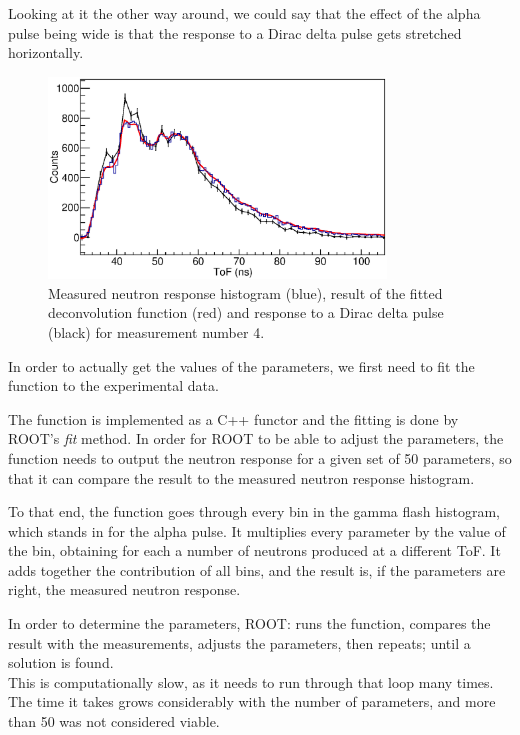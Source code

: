 \documentclass[a4paper,12pt]{report}
\begin{document}
Looking at it the other way around, we could say that the effect of the alpha pulse being wide is that the response to a Dirac delta pulse gets stretched horizontally.
\\

\begin{figure}[H]
	\centering
	\includegraphics[width=0.80\textwidth]{pulsed_deconvolution_delta.eps}
	\caption{Measured neutron response histogram (blue), result of the fitted deconvolution function (red) and response to a Dirac delta pulse (black) for measurement number 4.}
	\label{pulsed_deconvolution_delta}
\end{figure}

In order to actually get the values of the parameters, we first need to fit the function to the experimental data.

The function is implemented as a C++ functor and the fitting is done by ROOT's \textit{fit} method.
In order for ROOT to be able to adjust the parameters, the function needs to output the neutron response for a given set of 50 parameters, so that it can compare the result to the measured neutron response histogram.

To that end, the function goes through every bin in the gamma flash histogram, which stands in for the alpha pulse.
It multiplies every parameter by the value of the bin, obtaining for each a number of neutrons produced at a different ToF.
It adds together the contribution of all bins, and the result is, if the parameters are right, the measured neutron response.

In order to determine the parameters, ROOT: runs the function, compares the result with the measurements, adjusts the parameters, then repeats; until a solution is found.
\\

This is computationally slow, as it needs to run through that loop many times.
The time it takes grows considerably with the number of parameters, and more than 50 was not considered viable.
\end{document}
